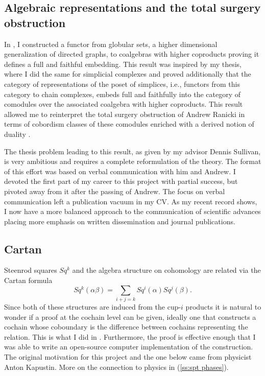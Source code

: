 \subsection{Algebraic representations and the total surgery obstruction} \label{ss:algebraic representations}

In \cite{medina2020globular}, I constructed a functor from globular sets, a higher dimensional generalization of directed graphs, to coalgebras with higher coproducts proving it defines a full and faithful embedding.
This result was inspired by my thesis, where I did the same for simplicial complexes and proved additionally that the category of representations of the poset of simplices, i.e., functors from this category to chain complexes, embeds full and faithfully into the category of comodules over the associated coalgebra with higher coproducts.
This result allowed me to reinterpret the total surgery obstruction of Andrew Ranicki \cite{ranicki1992topological} in terms of cobordism classes of these comodules enriched with a derived notion of duality \cite{medina2015thesis}.

The thesis problem leading to this result, as given by my advisor Dennis Sullivan, is very ambitious and requires a complete reformulation of the theory.
The format of this effort was based on verbal communication with him and Andrew.
I devoted the first part of my career to this project with partial success, but pivoted away from it after the passing of Andrew.
The focus on verbal communication left a publication vacuum in my CV.
As my recent record shows, I now have a more balanced approach to the communication of scientific advances placing more emphasis on written dissemination and journal publications.

\subsection{Cartan} \label{ss:cartan}

Steenrod squares $Sq^k$ and the algebra structure on cohomology are related via the Cartan formula
\begin{equation*}
Sq^k(\alpha \beta) = \sum_{i+j=k} Sq^i(\alpha) Sq^j(\beta).
\end{equation*}
Since both of these structures are induced from the cup-$i$ products it is natural to wonder if a proof at the cochain level can be given, ideally one that constructs a cochain whose coboundary is the difference between cochains representing the relation.
This is what I did in \cite{medina2020cartan}.
Furthermore, the proof is effective enough that I was able to write an open-source computer implementation of the construction.
The original motivation for this project and the one below came from physicist Anton Kapustin.
More on the connection to physics in (\cref{ss:spt phases}).

